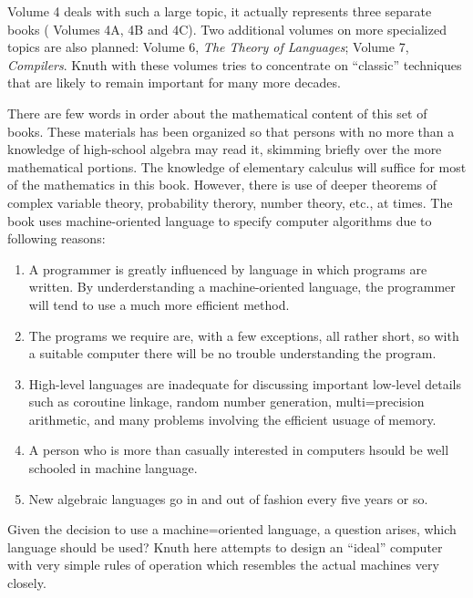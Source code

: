 \documentclass{article}
\begin{document}
Volume 4 deals with such a large topic, it actually represents three separate books ( Volumes 4A, 4B and 4C). Two additional volumes on more specialized topics are also planned: Volume 6, \textit{The Theory of Languages}; Volume 7, \textit{Compilers}. Knuth with these volumes tries to concentrate on ``classic'' techniques that are likely to remain important for many more decades. 

There are few words in order about the mathematical content of this set of books. These materials has been organized so that persons with no more than a knowledge of high-school algebra may read it, skimming briefly over the more mathematical portions. The knowledge of elementary calculus will suffice for most of the mathematics in this book. However, there is use of deeper theorems of complex variable theory, probability therory, number theory, etc., at times. The book uses machine-oriented language to specify computer algorithms due to following reasons:
\begin{enumerate}
    \item A programmer is greatly influenced by language in which programs are written. By underderstanding a machine-oriented language, the programmer will tend to use a much more efficient method.
    \item The programs we require are, with a few exceptions, all rather short, so with a suitable computer there will be no trouble understanding the program.
    \item High-level languages are inadequate for discussing important low-level details such as coroutine linkage, random number generation, multi=precision arithmetic, and many problems involving the efficient usuage of memory.
    \item A person who is more than casually interested in computers hsould be well schooled in machine language.
    \item New algebraic languages go in and out of fashion every five years or so.
\end{enumerate}

Given the decision to use a machine=oriented language, a question arises, which language should be used? Knuth here attempts to design an ``ideal'' computer with very simple rules of operation which resembles the actual machines very closely.
\end{document}
